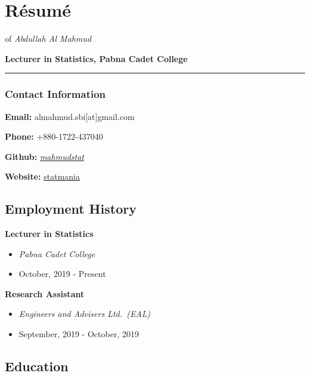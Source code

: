 \documentclass[
]{book}
\author{}
\date{\vspace{-2.5em}}
\providecommand{\tightlist}{%
  \setlength{\itemsep}{0pt}\setlength{\parskip}{0pt}}
\begin{document}
{
\setcounter{tocdepth}{1}
\tableofcontents
}
\hypertarget{ruxe9sumuxe9}{%
\chapter*{Résumé}\label{ruxe9sumuxe9}}

of \emph{Abdullah Al Mahmud}

\textbf{Lecturer in Statistics, Pabna Cadet College}

\begin{center}\rule{0.5\linewidth}{0.5pt}\end{center}

\hypertarget{contact-information}{%
\subsection*{Contact Information}\label{contact-information}}

\textbf{Email:} almahmud.sbi{[}at{]}gmail.com

\textbf{Phone:} +880-1722-437040

\textbf{Github:} \href{https://github.com/mahmudstat}{\emph{mahmudstat}}

\textbf{Website:} \href{mahmud.statmania.info}{statmania}

\hypertarget{employment-history}{%
\section*{Employment History}\label{employment-history}}

\textbf{Lecturer in Statistics}

\begin{itemize}
\tightlist
\item
  \emph{Pabna Cadet College}\\
\item
  October, 2019 - Present
\end{itemize}

\textbf{Research Assistant}

\begin{itemize}
\tightlist
\item
  \emph{Engineers and Advisers Ltd.~(EAL)}
\item
  September, 2019 - October, 2019
\end{itemize}

\hypertarget{education}{%
\section*{Education}\label{education}}
\end{document}
